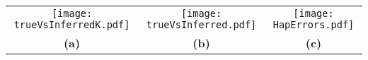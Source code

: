 \documentclass[preview]{standalone}
\begin{document}
\begin{tabular}{ccc}
    \texttt{[image: trueVsInferredK.pdf]}&\texttt{[image: trueVsInferred.pdf]}&\texttt{[image: HapErrors.pdf]}\\
    {\LARGE \bf (a)}&{\LARGE \bf (b)}&{\LARGE \bf (c)}\\
\end{tabular}
\end{document}
